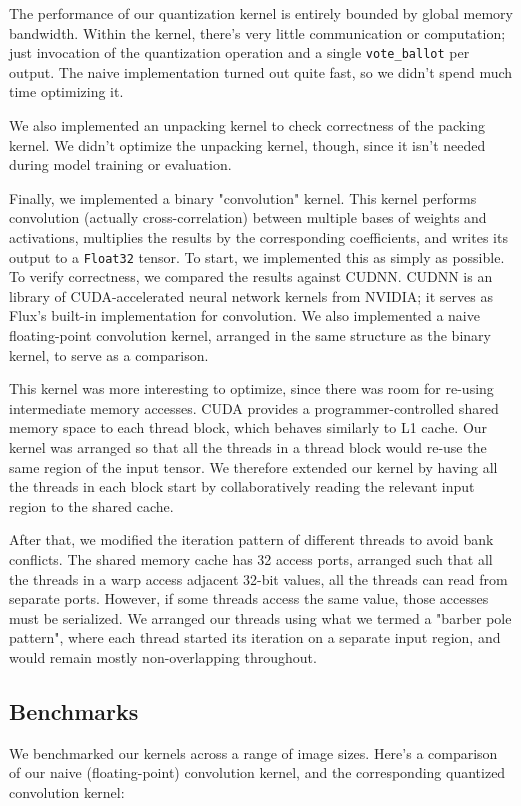 \documentclass[12pt]{article}
\begin{document}
The performance of our quantization kernel is entirely bounded by global memory bandwidth. Within the kernel, there's very little communication or computation; just invocation of the quantization operation and a single \texttt{vote\_ballot} per output. The naive implementation turned out quite fast, so we didn't spend much time optimizing it.

We also implemented an unpacking kernel to check correctness of the packing kernel. We didn't optimize the unpacking kernel, though, since it isn't needed during model training or evaluation.

Finally, we implemented a binary "convolution" kernel. This kernel performs convolution (actually cross-correlation) between multiple bases of weights and activations, multiplies the results by the corresponding coefficients, and writes its output to a \texttt{Float32} tensor. To start, we implemented this as simply as possible. To verify correctness, we compared the results against CUDNN. CUDNN is an library of CUDA-accelerated neural network kernels from NVIDIA; it serves as Flux's built-in implementation for convolution. We also implemented a naive floating-point convolution kernel, arranged in the same structure as the binary kernel, to serve as a comparison.

This kernel was more interesting to optimize, since there was room for re-using intermediate memory accesses. CUDA provides a programmer-controlled shared memory space to each thread block, which behaves similarly to L1 cache. Our kernel was arranged so that all the threads in a thread block would re-use the same region of the input tensor. We therefore extended our kernel by having all the threads in each block start by collaboratively reading the relevant input region to the shared cache.

After that, we modified the iteration pattern of different threads to avoid bank conflicts. The shared memory cache has 32 access ports, arranged such that all the threads in a warp access adjacent 32-bit values, all the threads can read from separate ports. However, if some threads access the same value, those accesses must be serialized. We arranged our threads using what we termed a "barber pole pattern", where each thread started its iteration on a separate input region, and would remain mostly non-overlapping throughout.

\subsection{Benchmarks}
\label{sec:org5328ccc}
We benchmarked our kernels across a range of image sizes. Here's a comparison of our naive (floating-point) convolution kernel, and the corresponding quantized convolution kernel:
\end{document}
